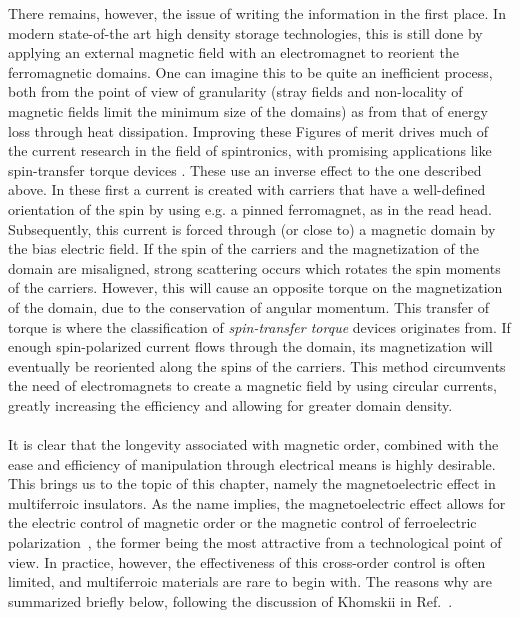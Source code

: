 There remains, however, the issue of writing the information in the first place.
In modern state-of-the art high density storage technologies, this is still done by applying an external magnetic field with an electromagnet to reorient the ferromagnetic domains. One can imagine this to be quite an inefficient process, both from the point of view of granularity (stray fields and non-locality of magnetic fields limit the minimum size of the domains) as from that of energy loss through heat dissipation.
Improving these Figures of merit drives much of the current research in the field of spintronics, with promising applications like spin-transfer torque devices \cite{Nunez2006TheorySemiconductors,Nunez2006TheoryMetals,Nunez2011, Kent2015, Jungwirth2016}.
These use an inverse effect to the one described above.
In these first a current is created with carriers that have a well-defined orientation of the spin by using e.g. a pinned ferromagnet, as in the read head.
Subsequently, this current is forced through (or close to) a magnetic domain by the bias electric field.
If the spin of the carriers and the magnetization of the domain are misaligned, strong scattering occurs which rotates the spin moments of the carriers.
However, this will cause an opposite torque on the magnetization of the domain, due to the conservation of angular momentum. This transfer of torque is where the classification of {\it spin-transfer torque} devices originates from.
If enough spin-polarized current flows through the domain, its magnetization will eventually be reoriented along the spins of the carriers. This method circumvents the need of electromagnets to create a magnetic field by using circular currents, greatly increasing the efficiency and allowing for greater domain density.
\\\\
It is clear that the longevity associated with magnetic order, combined with the ease and efficiency of manipulation through electrical means is highly desirable.
This brings us to the topic of this chapter, namely the magnetoelectric effect in multiferroic insulators.
As the name implies, the magnetoelectric effect allows for the electric control of magnetic order or the magnetic control of ferroelectric polarization~\cite{Spaldin2019,Khomskii2009,Fiebig2005,Fiebig2016,Cheong2007}, the former being the most attractive from a technological point of view.
In practice, however, the effectiveness of this cross-order control is often limited, and multiferroic materials are rare to begin with.
The reasons why are summarized briefly below, following the discussion of Khomskii in Ref.~\cite{Khomskii2009}.
